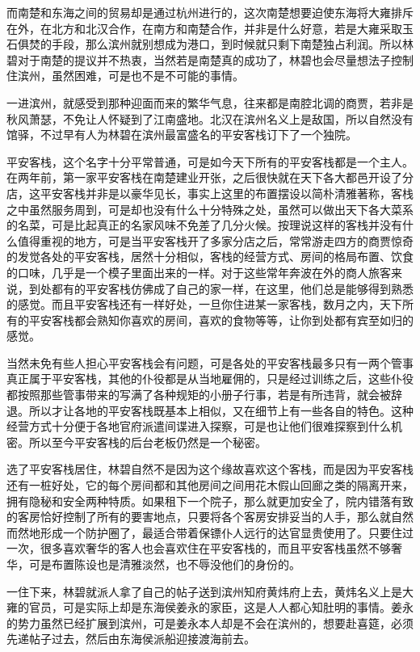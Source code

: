 而南楚和东海之间的贸易却是通过杭州进行的，这次南楚想要迫使东海将大雍排斥在外，在北方和北汉合作，在南方和南楚合作，并非是什么好意，若是大雍采取玉石俱焚的手段，那么滨州就别想成为港口，到时候就只剩下南楚独占利润。所以林碧对于南楚的提议并不热衷，当然若是南楚真的成功了，林碧也会尽量想法子控制住滨州，虽然困难，可是也不是不可能的事情。

一进滨州，就感受到那种迎面而来的繁华气息，往来都是南腔北调的商贾，若非是秋风萧瑟，不免让人怀疑到了江南盛地。北汉在滨州名义上是敌国，所以自然没有馆驿，不过早有人为林碧在滨州最富盛名的平安客栈订下了一个独院。

平安客栈，这个名字十分平常普通，可是如今天下所有的平安客栈都是一个主人。在两年前，第一家平安客栈在南楚建业开张，之后很快就在天下各大都邑开设了分店，这平安客栈并非是以豪华见长，事实上这里的布置摆设以简朴清雅著称，客栈之中虽然服务周到，可是却也没有什么十分特殊之处，虽然可以做出天下各大菜系的名菜，可是比起真正的名家风味不免差了几分火候。按理说这样的客栈并没有什么值得重视的地方，可是当平安客栈开了多家分店之后，常常游走四方的商贾惊奇的发觉各处的平安客栈，居然十分相似，客栈的经营方式、房间的格局布置、饮食的口味，几乎是一个模子里面出来的一样。对于这些常年奔波在外的商人旅客来说，到处都有的平安客栈仿佛成了自己的家一样，在这里，他们总是能够得到熟悉的感觉。而且平安客栈还有一样好处，一旦你住进某一家客栈，数月之内，天下所有的平安客栈都会熟知你喜欢的房间，喜欢的食物等等，让你到处都有宾至如归的感觉。

当然未免有些人担心平安客栈会有问题，可是各处的平安客栈最多只有一两个管事真正属于平安客栈，其他的仆役都是从当地雇佣的，只是经过训练之后，这些仆役都按照那些管事带来的写满了各种规矩的小册子行事，若是有所违背，就会被辞退。所以才让各地的平安客栈既基本上相似，又在细节上有一些各自的特色。这种经营方式十分便于各地官府派遣间谍进入探察，可是也让他们很难探察到什么机密。所以至今平安客栈的后台老板仍然是一个秘密。

选了平安客栈居住，林碧自然不是因为这个缘故喜欢这个客栈，而是因为平安客栈还有一桩好处，它的每个房间都和其他房间之间用花木假山回廊之类的隔离开来，拥有隐秘和安全两种特质。如果租下一个院子，那么就更加安全了，院内错落有致的客房恰好控制了所有的要害地点，只要将各个客房安排妥当的人手，那么就自然而然地形成一个防护圈了，最适合带着保镖仆人远行的达官显贵使用了。只要住过一次，很多喜欢奢华的客人也会喜欢住在平安客栈的，而且平安客栈虽然不够奢华，可是布置陈设也是清雅淡然，也不辱没他们的身份的。

一住下来，林碧就派人拿了自己的帖子送到滨州知府黄炜府上去，黄炜名义上是大雍的官员，可是实际上却是东海侯姜永的家臣，这是人人都心知肚明的事情。姜永的势力虽然已经扩展到滨州，可是姜永本人却是不会在滨州的，想要赴喜筵，必须先递帖子过去，然后由东海侯派船迎接渡海前去。

